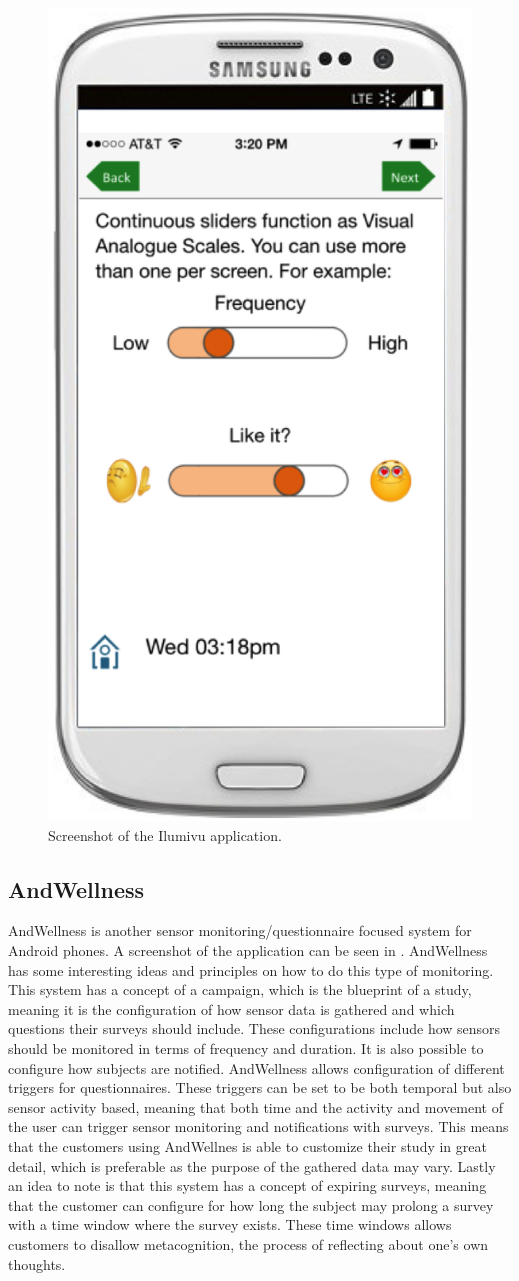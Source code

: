 \begin{figure}[!htbp]
	\centering
	\includegraphics[height=0.5\textwidth]{graphic/existing_solutions/ilumivu.png}
	\caption[]{Screenshot of the Ilumivu application\parencite{lumivu}.}
	\label{fig:ilumivu_screenshot}
\end{figure}
\FloatBarrier

\subsection{AndWellness}
\label{sub:andwellness}
AndWellness \parencite{hicks2010andwellness} is another sensor monitoring/questionnaire focused system for Android phones. A screenshot of the application can be seen in . AndWellness has some interesting ideas and principles on how to do this type of monitoring. This system has a concept of a campaign, which is the blueprint of a study, meaning it is the configuration of how sensor data is gathered and which questions their surveys should include. These configurations include how sensors should be monitored in terms of frequency and duration. It is also possible to configure how subjects are notified. AndWellness allows configuration of different triggers for questionnaires. These triggers can be set to be both temporal but also sensor activity based, meaning that both time and the activity and movement of the user can trigger sensor monitoring and notifications with surveys. This means that the customers using AndWellnes is able to customize their study in great detail, which is preferable as the purpose of the gathered data may vary. Lastly an idea to note is that this system has a concept of expiring surveys, meaning that the customer can configure for how long the subject may prolong a survey with a time window where the survey exists. These time windows allows customers to disallow metacognition, the process of reflecting about one's own thoughts.

